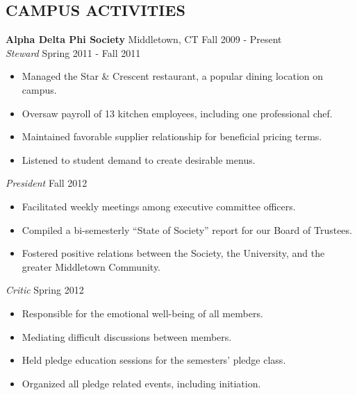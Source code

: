 \documentclass[11pt]{res} %
\begin{document}
\begin{resume}
\vspace{-0.05in} %



\section{CAMPUS ACTIVITIES} 
{\bf Alpha Delta Phi Society} Middletown, CT \hfill Fall 2009 - Present\\
{\it Steward} \hfill Spring 2011 - Fall 2011\\
\vspace{-0.17in}
 \begin{itemize} \itemsep -2pt
   \item Managed the Star \& Crescent restaurant, a popular dining location on
   campus.  
   \item Oversaw payroll of 13 kitchen employees, including one professional 
   chef.  
   \item Maintained favorable supplier relationship for beneficial pricing 
   terms.  
   \item Listened to student demand to create desirable menus.
   \end{itemize}

\vspace{-0.1in}
   
{\it President } \hfill Fall 2012\\
\vspace{-0.17in}
 \begin{itemize} \itemsep -2pt
   \item Facilitated weekly meetings among executive committee officers.
   \item Compiled a bi-semesterly ``State of Society'' report for our Board of 
   Trustees.
   \item Fostered positive relations between the Society, the University, and 
   the greater Middletown Community.
   \end{itemize}

\vspace{-0.1in}
   
{\it Critic } \hfill Spring 2012\\
\vspace{-0.17in}
 \begin{itemize} \itemsep -2pt
   \item Responsible for the emotional well-being of all members.
   \item Mediating difficult discussions between members.
   \item Held pledge education sessions for the semesters' pledge class.
   \item Organized all pledge related events, including initiation.
   \end{itemize}



\end{resume}
\end{document}
